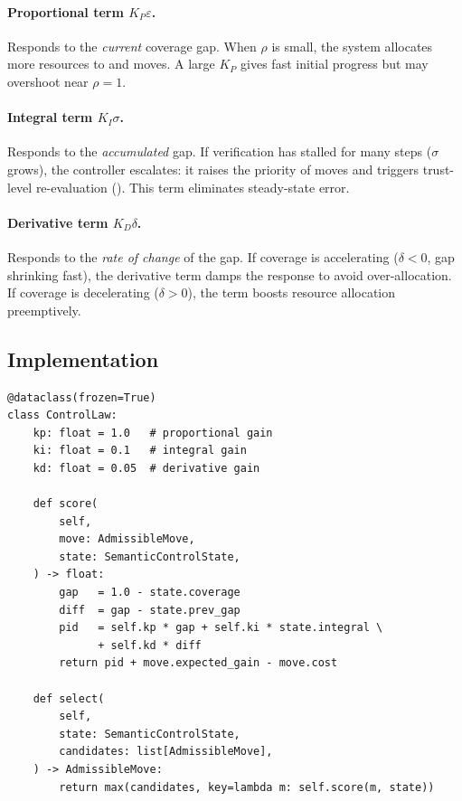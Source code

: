 \documentclass[11pt]{article}
\newcommand{\vcov}{\rho}                   %
\newcommand{\vgap}{\varepsilon}            %
\newcommand{\vint}{\sigma}                 %
\newcommand{\vdiff}{\delta}                %
\newcommand{\Kp}{K_P}                      %
\newcommand{\Ki}{K_I}                      %
\newcommand{\Kd}{K_D}                      %
\begin{document}
\paragraph{Proportional term $\Kp \vgap$.}
Responds to the \emph{current} coverage gap.  When $\vcov$ is small,
the system allocates more resources to \VERIFY{} and \CONSTRUCT{}
moves.  A large $\Kp$ gives fast initial progress but may overshoot
near $\vcov = 1$.

\paragraph{Integral term $\Ki \vint$.}
Responds to the \emph{accumulated} gap.  If verification has stalled
for many steps ($\vint$ grows), the controller escalates: it raises the
priority of \REPAIR{} moves and triggers trust-level re-evaluation
(\ESCALATE{}).  This term eliminates steady-state error.

\paragraph{Derivative term $\Kd \vdiff$.}
Responds to the \emph{rate of change} of the gap.  If coverage is
accelerating ($\vdiff < 0$, gap shrinking fast), the derivative term
damps the response to avoid over-allocation.  If coverage is
decelerating ($\vdiff > 0$), the term boosts resource allocation
preemptively.

\subsection{Implementation}

\begin{lstlisting}[style=jugeo-python, caption={\texttt{ControlLaw} in \JuGeo{}.}]
@dataclass(frozen=True)
class ControlLaw:
    kp: float = 1.0   # proportional gain
    ki: float = 0.1   # integral gain
    kd: float = 0.05  # derivative gain

    def score(
        self,
        move: AdmissibleMove,
        state: SemanticControlState,
    ) -> float:
        gap   = 1.0 - state.coverage
        diff  = gap - state.prev_gap
        pid   = self.kp * gap + self.ki * state.integral \
              + self.kd * diff
        return pid + move.expected_gain - move.cost

    def select(
        self,
        state: SemanticControlState,
        candidates: list[AdmissibleMove],
    ) -> AdmissibleMove:
        return max(candidates, key=lambda m: self.score(m, state))
\end{lstlisting}
\end{document}

